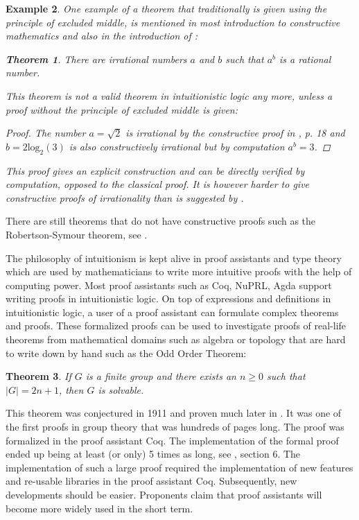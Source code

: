 \documentclass[12pt,a4paper,twoside,xetex]{book} %
\newtheorem{theorem}{Theorem}[section]
\newtheorem{example}[theorem]{Example}
\begin{document}
\begin{example}

One example of a theorem that traditionally is given using the principle of excluded middle, is mentioned in most introduction to constructive mathematics and also in the introduction of 
\cite{Palmgren2014}:

\begin{theorem}
  There are irrational numbers $a$ and $b$ such that $a^b$ is a rational number.
\end{theorem} 

This theorem is not a valid theorem in intuitionistic logic any more, unless a proof without the principle of excluded middle is given:

\begin{proof}
The number $a = \sqrt{2}$ is irrational by the constructive proof in \cite{Rosenblatt1983}, p. 18 and $b=2\text{log}_2(3)$ is also constructively irrational but by computation $a^b=3$.
\end{proof}

This proof gives an explicit construction and can be directly verified by computation, opposed to the classical proof. It is however harder to give constructive proofs of  irrationality than is suggested by \cite{Bauer2009}.

\end{example}

There are still theorems that do not have constructive proofs such as the Robertson-Symour theorem, see \cite{BIENSTOCK1995481}.

The philosophy of intuitionism is kept alive in proof assistants and type theory which are used by mathematicians to write more intuitive proofs with the help of computing power. Most proof assistants such as Coq, NuPRL, Agda support writing proofs in intuitionistic logic. On top of expressions and definitions in intuitionistic logic, a user of a proof assistant can formulate complex theorems and proofs. These formalized proofs can be used to investigate proofs of real-life theorems from mathematical domains such as algebra or topology that are hard to write down by hand such as the Odd Order Theorem:

\begin{theorem}
If $G$ is a finite group and there exists an $n \geq 0$ such that $|G| = 2n+1$, then $G$ is solvable.
\end{theorem}

This theorem was conjectured in 1911 and proven much later in \cite{Feit1963}. It was one of the first proofs in group theory that was hundreds of pages long. The proof was formalized in the proof assistant Coq. The implementation of the formal proof ended up being at least (or only) 5 times as long, see \cite{Gonthier2013}, section 6. The implementation of such a large proof required the implementation of new features and re-usable libraries in the proof assistant Coq. Subsequently, new developments should be easier. Proponents claim that proof assistants will become more widely used in the short term.
\end{document}

